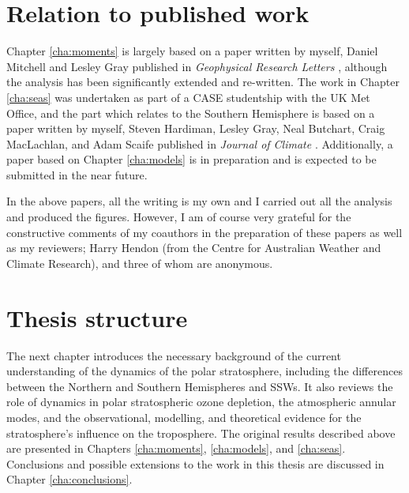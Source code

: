 \section{Relation to published work}
Chapter \ref{cha:moments} is largely based on a paper written by myself, Daniel
Mitchell and Lesley Gray published in \emph{Geophysical Research Letters}
\citep{Seviour2013}, although the analysis has been significantly extended and
re-written. The work in Chapter \ref{cha:seas} was undertaken as part of a CASE
studentship with the UK Met Office, and the part which relates to the Southern
Hemisphere is based on a paper written by myself, Steven Hardiman, Lesley Gray,
Neal Butchart, Craig MacLachlan, and Adam Scaife published in \emph{Journal of
  Climate} \citep{Seviour2014}. Additionally, a paper based on Chapter
\ref{cha:models} is in preparation and is expected to be submitted in the near
future.

In the above papers, all the writing is my own and I carried out all the
analysis and produced the figures. However, I am of course very grateful for the
constructive comments of my coauthors in the preparation of these papers as well
as my reviewers; Harry Hendon (from the Centre for Australian Weather and
Climate Research), and three of whom are anonymous.

\section{Thesis structure}

The next chapter introduces the necessary background of the current
understanding of the dynamics of the polar stratosphere, including the
differences between the Northern and Southern Hemispheres and SSWs. It also
reviews the role of dynamics in polar stratospheric ozone depletion, the
atmospheric annular modes, and the observational, modelling, and theoretical
evidence for the stratosphere's influence on the troposphere. The original
results described above are presented in Chapters \ref{cha:moments},
\ref{cha:models}, and \ref{cha:seas}. Conclusions and possible extensions to
the work in this thesis are discussed in Chapter \ref{cha:conclusions}. 










